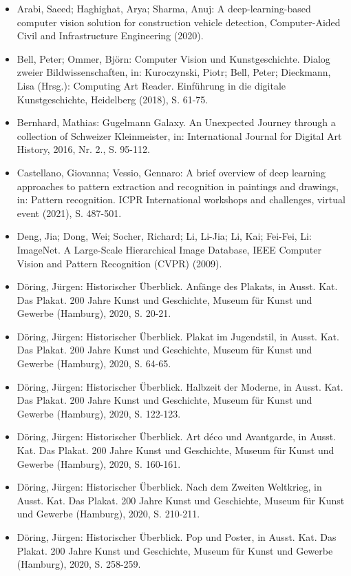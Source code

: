 \documentclass[a4paper,12pt,ngerman]{article}
\begin{document}
\begin{itemize}
	\item Arabi, Saeed; Haghighat, Arya; Sharma, Anuj: A deep-learning-based computer vision solution for construction vehicle detection, Computer-Aided Civil and Infrastructure Engineering (2020).
	\item Bell, Peter; Ommer, Björn: Computer Vision und Kunstgeschichte. Dialog zweier Bildwissenschaften, in: Kuroczynski, Piotr; Bell, Peter; Dieckmann, Lisa (Hrsg.): Computing Art Reader. Einführung in die digitale Kunstgeschichte, Heidelberg (2018), S. 61-75. 
	\item Bernhard, Mathias: Gugelmann Galaxy. An Unexpected Journey through a collection of Schweizer Kleinmeister, in: International Journal for Digital Art History, 2016, Nr. 2., S. 95-112.
	\item Castellano, Giovanna; Vessio, Gennaro: A brief overview of deep learning approaches to pattern extraction and recognition in paintings and drawings, in: Pattern recognition. ICPR International workshops and challenges, virtual event (2021), S. 487-501.
	\item Deng, Jia; Dong, Wei; Socher, Richard; Li, Li-Jia; Li, Kai; Fei-Fei, Li: ImageNet. A Large-Scale Hierarchical Image Database, IEEE Computer Vision and Pattern Recognition (CVPR) (2009).
	\item Döring, Jürgen: Historischer Überblick. Anfänge des Plakats, in Ausst. Kat. Das Plakat. 200 Jahre Kunst und Geschichte, Museum für Kunst und Gewerbe (Hamburg), 2020, S. 20-21.
	\item Döring, Jürgen: Historischer Überblick. Plakat im Jugendstil, in Ausst. Kat. Das Plakat. 200 Jahre Kunst und Geschichte, Museum für Kunst und Gewerbe (Hamburg), 2020, S. 64-65.
	\item Döring, Jürgen: Historischer Überblick. Halbzeit der Moderne, in Ausst. Kat. Das Plakat. 200 Jahre Kunst und Geschichte, Museum für Kunst und Gewerbe (Hamburg), 2020, S. 122-123.
	\item Döring, Jürgen: Historischer Überblick. Art déco und Avantgarde, in Ausst. Kat. Das Plakat. 200 Jahre Kunst und Geschichte, Museum für Kunst und Gewerbe (Hamburg), 2020, S. 160-161.
	\item Döring, Jürgen: Historischer Überblick. Nach dem Zweiten Weltkrieg, in Ausst. Kat. Das Plakat. 200 Jahre Kunst und Geschichte, Museum für Kunst und Gewerbe (Hamburg), 2020, S. 210-211.
	\item Döring, Jürgen: Historischer Überblick. Pop und Poster, in Ausst. Kat. Das Plakat. 200 Jahre Kunst und Geschichte, Museum für Kunst und Gewerbe (Hamburg), 2020, S. 258-259.

\end{itemize}
\end{document}
